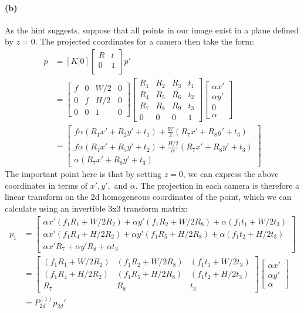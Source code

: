 \documentclass{article}
\newcommand{\spart}[1]{\paragraph{(#1)}}
\begin{document}
\spart{b} As the hint suggests, suppose that all points in our image exist in a plane defined by $z=0$. The projected coordinates for a camera then take the form:
\begin{align}
p &= [K|0]
\begin{bmatrix}
R & t \\
0 & 1 \\
\end{bmatrix}
p' \\
&= 
\begin{bmatrix}
f & 0 & W/2 & 0 \\
0 & f & H/2 & 0 \\
0 & 0 & 1 & 0
\end{bmatrix}
\begin{bmatrix}
R_1 & R_2 & R_3 & t_1 \\
R_4 & R_5 & R_6 & t_2 \\
R_7 & R_8 & R_9 & t_3 \\
0 & 0 & 0 & 1
\end{bmatrix}
\begin{bmatrix}
\alpha x' \\
\alpha y' \\
0 \\
\alpha
\end{bmatrix} \\
&=
\begin{bmatrix}
f \alpha (R_1x' + R_2y' + t_1) + \frac{W}{2}(R_7x' + R_8y' + t_3) \\
f \alpha (R_4x'+R_5y'+t_2) + \frac{H/2}\alpha (R_7x' + R_8y' + t_3) \\
\alpha (R_7x' + R_8y' + t_3)
\end{bmatrix}
\end{align}
The important point here is that by setting $z=0$, we can express the above coordinates in terms of $x', y',$ and $\alpha$. The projection in each camera is therefore a linear transform on the 2d homogeneous coordinates of the point, which we can calculate using an invertible 3x3 transform matrix:
\begin{align}
p_1 &= \begin{bmatrix}
\alpha x'(f_1R_1+W/2R_2) + \alpha y'(f_1R_2+W/2R_8)+\alpha(f_1t_1+W/2t_3) \\
\alpha x'(f_1R_4+H/2R_2) + \alpha y'(f_1R_5+H/2R_8)+\alpha(f_1t_2+H/2t_3) \\
\alpha x'R_7 + \alpha y'R_8 + \alpha t_3
\end{bmatrix} \\
&= \begin{bmatrix}
(f_1R_1+W/2R_2) & (f_1R_2+W/2R_8) & (f_1t_1+W/2t_3) \\
(f_1R_4+H/2R_2) & (f_1R_5+H/2R_8) & (f_1t_2+H/2t_3) \\
R_7 & R_8 & t_3
\end{bmatrix}
\begin{bmatrix}
\alpha x' \\
\alpha y' \\
\alpha 
\end{bmatrix} \\
&= P^{(1)}_{2d}p_{2d}'
\end{align}
\end{document}
